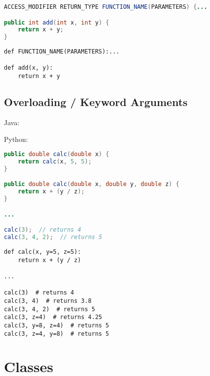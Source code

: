 \documentclass{article}
\begin{document}
\begin{minipage}{0.45\linewidth}
    \begin{lstlisting}[language=Java]
ACCESS_MODIFIER RETURN_TYPE FUNCTION_NAME(PARAMETERS) {...

public int add(int x, int y) {
    return x + y;
}
    \end{lstlisting}
\end{minipage}
\hfill
\begin{minipage}{0.45\linewidth}
    \begin{lstlisting}
def FUNCTION_NAME(PARAMETERS):...

def add(x, y):
    return x + y
    \end{lstlisting}
\end{minipage}

\subsection{Overloading / Keyword Arguments}
\begin{minipage}{0.45\linewidth}
    Java:
\end{minipage}
\hfill
\begin{minipage}{0.45\linewidth}
    Python:
\end{minipage}

\begin{minipage}{0.45\linewidth}
    \begin{lstlisting}[language=Java]
public double calc(double x) {
    return calc(x, 5, 5);
}

public double calc(double x, double y, double z) {
    return x + (y / z);
}

...

calc(3);  // returns 4
calc(3, 4, 2);  // returns 5
    \end{lstlisting}
\end{minipage}
\hfill
\begin{minipage}{0.45\linewidth}
    \begin{lstlisting}
def calc(x, y=5, z=5):
    return x + (y / z)

...

calc(3)  # returns 4
calc(3, 4)  # returns 3.8
calc(3, 4, 2)  # returns 5
calc(3, z=4)  # returns 4.25
calc(3, y=8, z=4)  # returns 5
calc(3, z=4, y=8)  # returns 5
    \end{lstlisting}
\end{minipage}

\newpage
\section{Classes}
\end{document}
